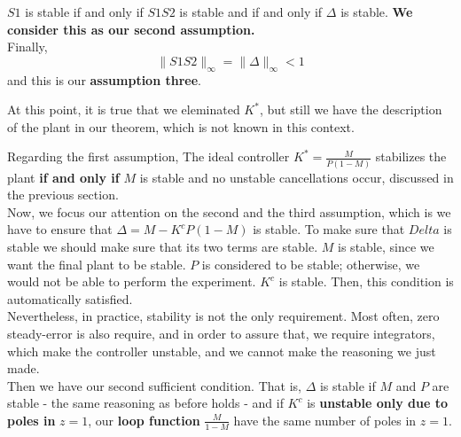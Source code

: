 $S1$ is stable if and only if $S1S2$ is stable and if and only if $\Delta$ is stable. \textbf{We consider this as our second assumption.}\\

Finally, 
\[
\|S1S2\|_\infty = \|\Delta\|_\infty < 1
\]
and this is our \textbf{assumption three}.

At this point, it is true that we eleminated $K^{*}$, but still we have the description of the plant in our theorem, which is not known in this context.


Regarding the first assumption, The ideal controller $K^{*} = \frac{M}{P(1-M)}$ stabilizes the plant \textbf{if and only if} $M$ is stable and no unstable cancellations occur, discussed in the previous section.\\
Now, we focus our attention on the second and the third assumption, which is we have to ensure that $\Delta = M - K^{c}P(1-M)$ is stable. To make sure that $Delta$ is stable we should make sure that its two terms are stable. $M$ is stable, since we want the final plant to be stable. $P$ is considered to be stable; otherwise, we would not be able to perform the experiment. $K^{c}$ is stable. Then, this condition is automatically satisfied. \\

Nevertheless, in practice, stability is not the only requirement. Most often, zero steady-error is also require, and in order to assure that, we require integrators, which make the controller unstable, and we cannot make the reasoning we just made. \\

Then we have our second sufficient condition. That is, $\Delta$ is stable if $M$ and $P$ are stable - the same reasoning as before holds - and if $K^{c}$ is \textbf{unstable only due to poles in} $z = 1$, our \textbf{loop function} $\frac{M}{1-M}$ have the same number of poles in $z = 1$.



















